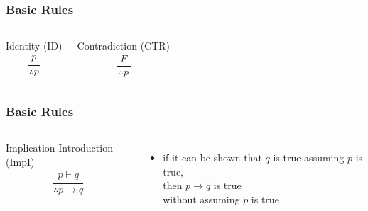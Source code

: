 \documentclass[dvipsnames]{beamer}
\begin{document}
\begin{frame}
  \frametitle{Basic Rules}

  \begin{columns}
    \begin{block}{Identity (ID)}
      \[
      \frac
        {
          \begin{array}{c}
            p
          \end{array}
        }
        {
          \therefore p
        }
      \]
    \end{block}

    \pause
    \begin{block}{Contradiction (CTR)}
    \[
    \frac
      {
        \begin{array}{c}
          F
        \end{array}
      }
      {
        \therefore p
      }
    \]
    \end{block}
  \end{columns}
\end{frame}

\begin{frame}
  \frametitle{Basic Rules}

  \begin{columns}
    \begin{block}{Implication Introduction (ImpI)}
      \[
      \frac
        {
          \begin{array}{c}
            p \vdash q
          \end{array}
        }
        {
          \therefore p \rightarrow q
        }
      \]
    \end{block}

    \pause
    \begin{itemize}
      \item if it can be shown that $q$ is true assuming $p$ is true,\\
        then $p \rightarrow q$ is true\\
        \alert{without assuming $p$ is true}\\
    \end{itemize}
  \end{columns}
\end{frame}
\end{document}
